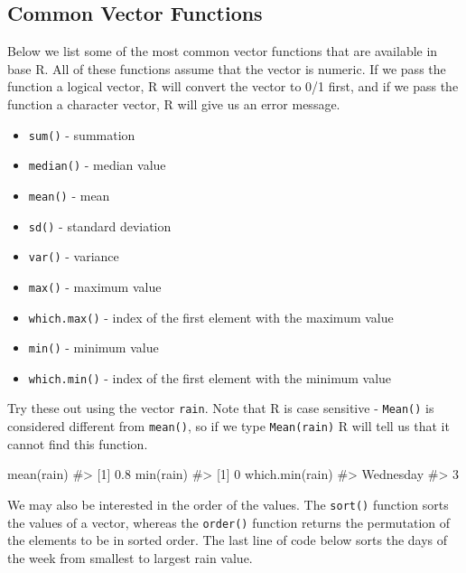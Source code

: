 \documentclass[
  letterpaper,
]{krantz}
\makeatletter
\newenvironment{Shaded}{\begin{snugshade}}{\end{snugshade}}
\newcommand{\CommentTok}[1]{\textcolor[rgb]{0.37,0.37,0.37}{#1}}
\newcommand{\FunctionTok}[1]{\textcolor[rgb]{0.28,0.35,0.67}{#1}}
\newcommand{\NormalTok}[1]{\textcolor[rgb]{0.00,0.23,0.31}{#1}}
\providecommand{\tightlist}{%
  \setlength{\itemsep}{0pt}\setlength{\parskip}{0pt}}\usepackage{longtable,booktabs,array}
\newenvironment{kframe}{%
\medskip{}
\setlength{\fboxsep}{.8em}
 \def\at@end@of@kframe{}%
 \ifinner\ifhmode%
  \def\at@end@of@kframe{\end{minipage}}%
  \begin{minipage}{\columnwidth}%
 \fi\fi%
 \def\FrameCommand##1{\hskip\@totalleftmargin \hskip-\fboxsep
 \colorbox{shadecolor}{##1}\hskip-\fboxsep
     \hskip-\linewidth \hskip-\@totalleftmargin \hskip\columnwidth}%
 \MakeFramed {\advance\hsize-\width
   \@totalleftmargin\z@ \linewidth\hsize
   \@setminipage}}%
 {\par\unskip\endMakeFramed%
 \at@end@of@kframe}
\renewenvironment{Shaded}{\begin{kframe}}{\end{kframe}}
\makeatother
\begin{document}
\subsection{Common Vector Functions}\label{common-vector-functions}

Below we list some of the most common vector functions that are
available in base R. All of these functions assume that the vector is
numeric. If we pass the function a logical vector, R will convert the
vector to 0/1 first, and if we pass the function a character vector, R
will give us an error message.

\begin{itemize}
\tightlist
\item
  \texttt{sum()} - summation
\item
  \texttt{median()} - median value
\item
  \texttt{mean()} - mean
\item
  \texttt{sd()} - standard deviation
\item
  \texttt{var()} - variance
\item
  \texttt{max()} - maximum value
\item
  \texttt{which.max()} - index of the first element with the maximum
  value
\item
  \texttt{min()} - minimum value
\item
  \texttt{which.min()} - index of the first element with the minimum
  value
\end{itemize}

Try these out using the vector \texttt{rain}. Note that R is case
sensitive - \texttt{Mean()} is considered different from
\texttt{mean()}, so if we type \texttt{Mean(rain)} R will tell us that
it cannot find this function.

\begin{Shaded}
\begin{Highlighting}[]
\FunctionTok{mean}\NormalTok{(rain)  }
\CommentTok{\#\textgreater{} [1] 0.8}
\FunctionTok{min}\NormalTok{(rain) }
\CommentTok{\#\textgreater{} [1] 0}
\FunctionTok{which.min}\NormalTok{(rain) }
\CommentTok{\#\textgreater{} Wednesday }
\CommentTok{\#\textgreater{}         3}
\end{Highlighting}
\end{Shaded}

We may also be interested in the order of the values. The
\texttt{sort()} function sorts the values of a vector, whereas the
\texttt{order()} function returns the permutation of the elements to be
in sorted order. The last line of code below sorts the days of the week
from smallest to largest rain value.
\end{document}
